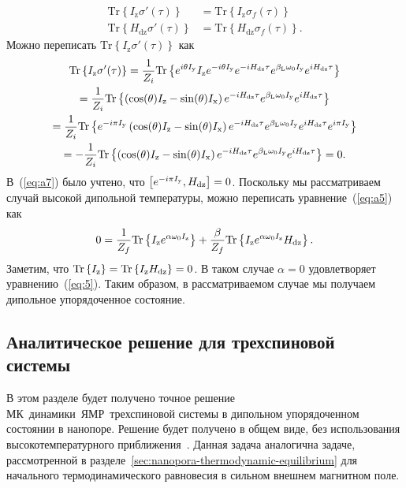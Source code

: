 \begin{align}
  \label{eq:a5}
  \mathrm{Tr} \left\{ I_\mathrm{z} \sigma'(\tau) \right\}
  & = \mathrm{Tr} \left\{ I_\mathrm{z} \sigma_{f}(\tau) \right\}
  \\
  \label{eq:a6}
  \mathrm{Tr} \left\{ H_\mathrm{dz} \sigma'(\tau) \right\}
  & = \mathrm{Tr} \left\{ H_\mathrm{dz} \sigma_{f}(\tau) \right\}.
\end{align}
%
Можно переписать $\mathrm{Tr} \left\{ I_\mathrm{z} \sigma'(\tau) \right\}$ как
%
\begin{multline}
  \label{eq:a7}
  \mathrm{Tr} \left\{ I_\mathrm{z} \sigma'(\tau) \right\}
  = \dfrac{1}{Z_{i}} \mathrm{Tr} \left\{ 
    e^{i \theta I_\mathrm{y}} I_\mathrm{z} e^{-i \theta I_\mathrm{y}}
    e^{-i H_\mathrm{dz} \tau} e^{\beta_\mathrm{L} \omega_{0} I_\mathrm{y}} e^{i H_\mathrm{dz} \tau}
   \right\}
  \\
  = \dfrac{1}{Z_i} \mathrm{Tr} \left\{ 
    \left( \cos(\theta) I_\mathrm{z} - \sin(\theta) I_\mathrm{x} \right)
    e^{-i H_\mathrm{dz} \tau} e^{\beta_\mathrm{L} \omega_{0} I_\mathrm{y}} e^{i H_\mathrm{dz} \tau}
   \right\}
  \\
  = \dfrac{1}{Z_i} \mathrm{Tr} \left\{ 
    e^{-i \pi I_\mathrm{y}}
    \left( \cos(\theta) I_\mathrm{z} - \sin(\theta) I_\mathrm{x} \right)
    e^{-i H_\mathrm{dz} \tau} e^{\beta_\mathrm{L} \omega_{0} I_\mathrm{y}} e^{i H_\mathrm{dz} \tau}
    e^{i \pi I_\mathrm{y}}
   \right\}
  \\
  = - \dfrac{1}{Z_i} \mathrm{Tr} \left\{ 
    \left( \cos(\theta) I_\mathrm{z} - \sin(\theta) I_\mathrm{x} \right)
    e^{-i H_\mathrm{dz} \tau} e^{\beta_\mathrm{L} \omega_{0} I_\mathrm{y}} e^{i H_\mathrm{dz} \tau}
   \right\} = 0.
\end{multline}
%
В~(\ref{eq:a7}) было учтено, что $\left[ e^{-i \pi I_\mathrm{y}}, H_\mathrm{dz} \right] = 0$.
Поскольку мы рассматриваем случай высокой дипольной температуры, можно переписать уравнение~(\ref{eq:a5}) как
\begin{equation}
  \label{eq:a8}
  0 = \dfrac{1}{Z_f} \mathrm{Tr} \left\{  I_\mathrm{z} e^{\alpha \omega_{0} I_\mathrm{z}} \right\}
  + \dfrac{\beta}{Z_f} \mathrm{Tr} \left\{ I_\mathrm{z} e^{\alpha \omega_{0} I_\mathrm{z}} H_\mathrm{dz} \right\}.
\end{equation}
%
Заметим, что $\mathrm{Tr} \left\{ I_\mathrm{z} \right\} = \mathrm{Tr} \left\{ I_\mathrm{z}H_\mathrm{dz} \right\} = 0$.
В таком случае $\alpha = 0$ удовлетворяет уравнению~(\ref{eq:5}).
Таким образом, в рассматриваемом случае мы получаем дипольное упорядоченное состояние.


\subsection{Аналитическое решение для трехспиновой системы}
\label{sec:3}

В этом разделе будет получено точное решение МК~динамики~ЯМР~трехспиновой системы в дипольном упорядоченном состоянии в нанопоре.
Решение будет получено в общем виде, без использования высокотемпературного приближения~\cite{Goldman1970}.
Данная задача аналогична задаче, рассмотренной в разделе~\ref{sec:nanopora-thermodynamic-equilibrium}
для начального термодинамического равновесия в сильном внешнем магнитном поле.


